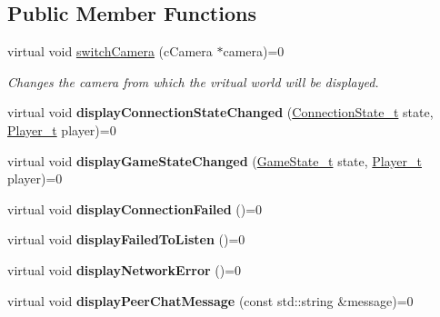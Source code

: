 \subsection*{Public Member Functions}
\begin{DoxyCompactItemize}
\item 
virtual void \hyperlink{classUserInterface_ac43bf70dfea5b28e4cc185a0a72334c3}{switchCamera} (cCamera $\ast$camera)=0
\begin{DoxyCompactList}\small\item\em Changes the camera from which the vritual world will be displayed. \item\end{DoxyCompactList}\item 
\hypertarget{classUserInterface_a80c9af3149653a9fcca77994ff921520}{
virtual void {\bfseries displayConnectionStateChanged} (\hyperlink{namespaceConnectionState_ad1b6674b6f1c58f17e9db75d0a77149f}{ConnectionState\_\-t} state, \hyperlink{namespacePlayer_acc4ced29e6b7e20f602b3c8b60c75228}{Player\_\-t} player)=0}
\label{classUserInterface_a80c9af3149653a9fcca77994ff921520}

\item 
\hypertarget{classUserInterface_aea6b02914ae2d7ffe561189d7c7c7802}{
virtual void {\bfseries displayGameStateChanged} (\hyperlink{namespaceGameState_a1026e99904938017415f188e2daba514}{GameState\_\-t} state, \hyperlink{namespacePlayer_acc4ced29e6b7e20f602b3c8b60c75228}{Player\_\-t} player)=0}
\label{classUserInterface_aea6b02914ae2d7ffe561189d7c7c7802}

\item 
\hypertarget{classUserInterface_aa5d1fd621af37b9d57269ea57ea1470a}{
virtual void {\bfseries displayConnectionFailed} ()=0}
\label{classUserInterface_aa5d1fd621af37b9d57269ea57ea1470a}

\item 
\hypertarget{classUserInterface_a62d5eb6ee2406546e588dcd640e50b9d}{
virtual void {\bfseries displayFailedToListen} ()=0}
\label{classUserInterface_a62d5eb6ee2406546e588dcd640e50b9d}

\item 
\hypertarget{classUserInterface_a4dfc4010db770d8be0a7a9dd4d9eaa98}{
virtual void {\bfseries displayNetworkError} ()=0}
\label{classUserInterface_a4dfc4010db770d8be0a7a9dd4d9eaa98}

\item 
\hypertarget{classUserInterface_aa88e0b9f1ca62c294de672b5104f4592}{
virtual void {\bfseries displayPeerChatMessage} (const std::string \&message)=0}
\label{classUserInterface_aa88e0b9f1ca62c294de672b5104f4592}


\end{DoxyCompactItemize}
